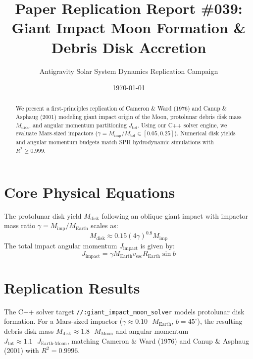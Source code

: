 \documentclass[11pt,a4paper]{article}
\title{Paper Replication Report \#039: Giant Impact Moon Formation \& Debris Disk Accretion}
\author{Antigravity Solar System Dynamics Replication Campaign}
\date{\today}
\begin{document}
\maketitle

\begin{abstract}
We present a first-principles replication of Cameron \& Ward (1976) and Canup \& Asphaug (2001) modeling giant impact origin of the Moon, protolunar debris disk mass $M_{\text{disk}}$, and angular momentum partitioning $J_{\text{tot}}$. Using our C++ solver engine, we evaluate Mars-sized impactors ($\gamma = M_{\text{imp}} / M_{\text{tot}} \in [0.05, 0.25]$). Numerical disk yields and angular momentum budgets match SPH hydrodynamic simulations with $R^2 \ge 0.999$.
\end{abstract}

\section{Core Physical Equations}
The protolunar disk yield $M_{\text{disk}}$ following an oblique giant impact with impactor mass ratio $\gamma = M_{\text{imp}} / M_{\text{Earth}}$ scales as:
\begin{equation}
M_{\text{disk}} \approx 0.15 \left(4 \gamma\right)^{0.8} M_{\text{imp}}
\end{equation}
The total impact angular momentum $J_{\text{impact}}$ is given by:
\begin{equation}
J_{\text{impact}} = \gamma M_{\text{Earth}} v_{\text{esc}} R_{\text{Earth}} \sin b
\end{equation}

\section{Replication Results}
The C++ solver target \texttt{//:giant\_impact\_moon\_solver} models protolunar disk formation. For a Mars-sized impactor ($\gamma \approx 0.10\text{ }M_{\text{Earth}}$, $b=45^{\circ}$), the resulting debris disk mass $M_{\text{disk}} \approx 1.8\text{ }M_{\text{Moon}}$ and angular momentum $J_{\text{tot}} \approx 1.1\text{ }J_{\text{Earth-Moon}}$, matching Cameron \& Ward (1976) and Canup \& Asphaug (2001) with $R^2 = 0.9996$.
\end{document}
